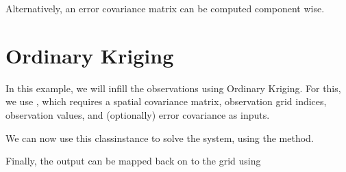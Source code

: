 \documentclass[letterpaper,10pt,english]{sphinxmanual}
\begin{document}
\sphinxAtStartPar
Alternatively, an error covariance matrix can be computed component wise.


\section{Ordinary Kriging}
\label{\detokenize{workflow:ordinary-kriging}}
\sphinxAtStartPar
In this example, we will infill the observations using Ordinary Kriging. For this, we use
{\hyperref[\detokenize{kriging:glomar_gridding.kriging.OrdinaryKriging}]{}}, which requires a spatial covariance matrix,
observation grid indices, observation values, and (optionally) error covariance as inputs.

\begin{sphinxVerbatim}[commandchars=\\\{\}]
  
\end{sphinxVerbatim}

\sphinxAtStartPar
We can now use this class\sphinxhyphen{}instance to solve the system, using the  method.

\begin{sphinxVerbatim}[commandchars=\\\{\}]
  
\end{sphinxVerbatim}

\sphinxAtStartPar
Finally, the output can be mapped back on to the grid using
{\hyperref[\detokenize{kriging:glomar_gridding.grid.assign_to_grid}]{}}

\begin{sphinxVerbatim}[commandchars=\\\{\}]
  
\end{sphinxVerbatim}
\end{document}
